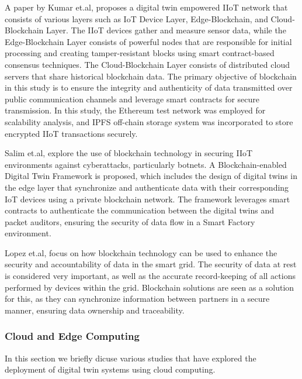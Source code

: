 A paper by Kumar et.al\cite{kumarBlockchainDeepLearning2022}, proposes a digital twin empowered IIoT network that consists of various layers such as IoT Device Layer, Edge-Blockchain, and Cloud-Blockchain Layer. The IIoT devices gather and measure sensor data, while the Edge-Blockchain Layer consists of powerful nodes that are responsible for initial processing and creating tamper-resistant blocks using smart contract-based consensus techniques. The Cloud-Blockchain Layer consists of distributed cloud servers that share historical blockchain data. The primary objective of blockchain in this study is to ensure the integrity and authenticity of data transmitted over public communication channels and leverage smart contracts for secure transmission. In this study, the Ethereum test network was employed for scalability analysis, and IPFS off-chain storage system was incorporated to store encrypted IIoT transactions securely.  

Salim et.al\cite{salimBlockchainEnabledSecureDigital2022}, explore the use of blockchain technology in securing IIoT environments against cyberattacks, particularly botnets. A Blockchain-enabled Digital Twin Framework is proposed, which includes the design of digital twins in the edge layer that synchronize and authenticate data with their corresponding IoT devices using a private blockchain network. The framework leverages smart contracts to authenticate the communication between the digital twins and packet auditors, ensuring the security of data flow in a Smart Factory environment.  

Lopez et.al\cite{lopezDIGITALTWINSINTELLIGENT2021}, focus on how blockchain technology can be used to enhance the security and accountability of data in the smart grid. The security of data at rest is considered very important, as well as the accurate record-keeping of all actions performed by devices within the grid. Blockchain solutions are seen as a solution for this, as they can synchronize information between partners in a secure manner, ensuring data ownership and traceability.  

\subsubsection{Cloud and Edge Computing}
In this section we briefly dicuse various studies that have explored the deployment of digital twin systems using cloud computing. 

